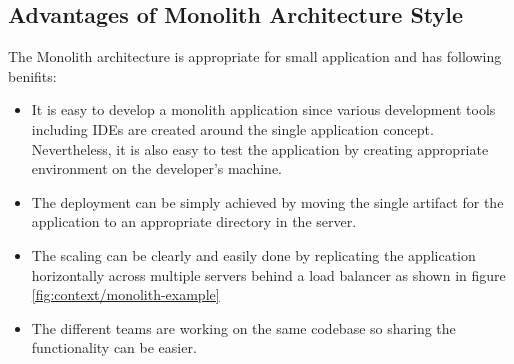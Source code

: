 \subsection{Advantages of Monolith Architecture Style}\label{subsection:context/monolith-advantages}
The Monolith architecture is appropriate for small application and has following benifits:\cite{Richardson:2014ab}\cite{Fowler:2014aa}\cite{Gupta:2015aa}\cite{Abram:2014aa}
\begin{itemize}[leftmargin=.5in]
\item It is easy to develop a monolith application since various development tools including \acrshort{IDE}s are created around the single application concept. Nevertheless, it is also easy to test the application by creating appropriate environment on the developer's machine.
\item The deployment can be simply achieved by moving the single artifact for the application to an appropriate directory in the server.
\item The scaling can be clearly and easily done by replicating the application horizontally across multiple servers behind a load balancer as shown in figure \ref{fig:context/monolith-example}
\item The different teams are working on the same codebase so sharing the functionality can be easier.
\end{itemize}
\\
